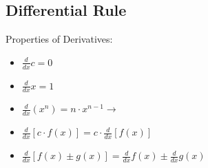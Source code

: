 \documentclass{report}
\begin{document}
    \pagebreak \bigbreak \noindent
    \subsection{Differential Rule}
    \bigbreak \noindent \bigbreak \noindent 
    Properties of Derivatives:
    \begin{itemize}
      \item $\frac{d}{dx}c  = 0$
      \item $\frac{d}{dx}x  = 1$
      \item $ \frac{d}{dx}(x^n) = n \cdot x^{n-1} \rightarrow$ 
      \item $ \frac{d}{dx}[c \cdot f(x)] = c \cdot \frac{d}{dx}[f(x)]$
      \item $ \frac{d}{dx}[f(x) \pm g(x)] = \frac{d}{dx}f(x)\pm \frac{d}{dx}g(x)$
    \end{itemize}


    \bigbreak \noindent \bigbreak \noindent 
\end{document}
